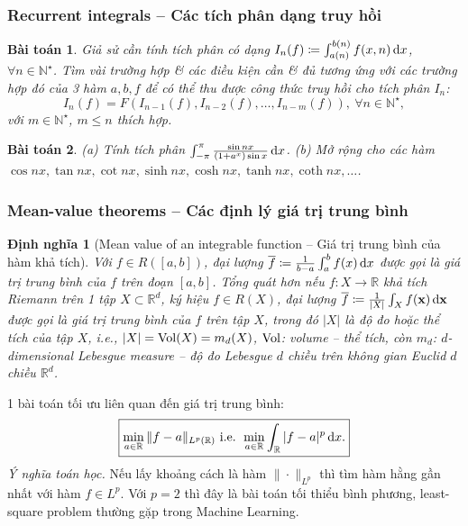 \documentclass{article}
\newtheorem{baitoan}{Bài toán}
\newtheorem{dinhnghia}{Định nghĩa}
\begin{document}

\subsubsection{Recurrent integrals -- Các tích phân dạng truy hồi}

\begin{baitoan}
	Giả sử cần tính tích phân có dạng $I_n(f)\coloneqq\int_{a(n)}^{b(n)} f(x,n)\,{\rm d}x$, $\forall n\in\mathbb{N}^\star$. Tìm vài trường hợp \& các điều kiện cần \& đủ tương ứng với các trường hợp đó của 3 hàm $a,b,f$ để có thể thu được công thức truy hồi cho tích phân $I_n$:
	\begin{equation*}
		I_n(f) = F(I_{n-1}(f),I_{n-2}(f),\ldots,I_{n-m}(f)),\ \forall n\in\mathbb{N}^\star,
	\end{equation*}
	với $m\in\mathbb{N}^\star$, $m\le n$ thích hợp.
\end{baitoan}

\begin{baitoan}
	(a) Tính tích phân $\int_{-\pi}^\pi \frac{\sin nx}{(1 + a^x)\sin x}\,{\rm d}x$. (b) Mở rộng cho các hàm $\cos nx,\tan nx,\cot nx,\sinh nx,\cosh nx,\tanh nx,\coth nx,\ldots$.
\end{baitoan}


\subsubsection{Mean-value theorems -- Các định lý giá trị trung bình}

\begin{dinhnghia}[Mean value of an integrable function -- Giá trị trung bình của hàm khả tích]
	Với $f\in R([a,b])$, đại lượng $\overline{f}\coloneqq\frac{1}{b - a}\int_a^b f(x)\,{\rm d}x$ được gọi là {\rm giá trị trung bình} của $f$ trên đoạn $[a,b]$. Tổng quát hơn nếu $f:X\to\mathbb{R}$ khả tích Riemann trên 1 tập $X\subset\mathbb{R}^d$, ký hiệu $f\in R(X)$, đại lượng $\overline{f}\coloneqq\frac{1}{|X|}\int_X f({\bf x})\,{\rm d}{\bf x}$ được gọi là {\rm giá trị trung bình} của $f$ trên tập $X$, trong đó $|X|$ là độ đo hoặc thể tích của tập $X$, i.e., $|X| = {\rm Vol}(X) = m_d(X)$, ${\rm Vol}$: volume -- thể tích, còn $m_d$: $d$-dimensional Lebesgue measure -- độ đo Lebesgue $d$ chiều trên không gian Euclid $d$ chiều $\mathbb{R}^d$.
\end{dinhnghia}
1 bài toán tối ưu liên quan đến giá trị trung bình:
\begin{equation*}
	\boxed{\min_{a\in\mathbb{R}} \|f - a\|_{L^p(\mathbb{R})}\mbox{ i.e. } \min_{a\in\mathbb{R}} \int_\mathbb{R} |f - a|^p\,{\rm d}x.}
\end{equation*}
{\it Ý nghĩa toán học.} Nếu lấy khoảng cách là hàm $\|\cdot\|_{L^p}$ thì tìm hàm hằng gần nhất với hàm $f\in L^p$. Với $p = 2$ thì đây là bài toán tối thiểu bình phương, least-square problem thường gặp trong Machine Learning.
\end{document}
